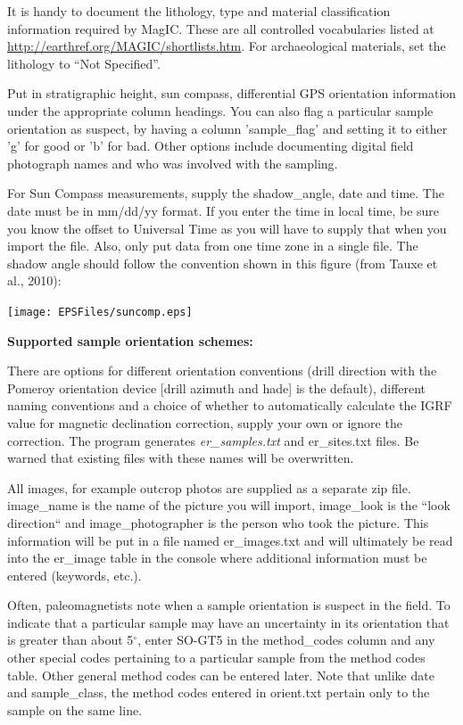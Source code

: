 \documentclass[11pt]{book}
\begin{document}
{   It is handy  to document the lithology, type and material classification information required by MagIC. These  are all controlled vocabularies listed at \url{http://earthref.org/MAGIC/shortlists.htm}.   For archaeological materials, set the lithology to ``Not Specified''.

   Put in stratigraphic height, sun compass, differential GPS orientation information under the appropriate column headings.  You can also flag a particular sample orientation as suspect, by having a column 'sample\_flag' and setting it to either 'g' for good or 'b' for bad.  Other options include documenting digital field photograph names and who was involved with the sampling.

 For Sun Compass measurements, supply the shadow\_angle, date and time. The date must be in mm/dd/yy format. If you enter the time in local time, be sure you know the offset to Universal Time as you will have to supply that when you import the file. Also, only put data from one time zone in a single file. The shadow angle should follow the convention shown in this figure (from Tauxe et al., 2010): \nocite{tauxe10}

  \texttt{[image: EPSFiles/suncomp.eps]}


{\bf Supported sample orientation schemes:}

  There are options for
 different orientation conventions (drill direction with the Pomeroy orientation device  [drill azimuth and hade] is the default), different naming conventions and a choice of whether to automatically calculate the IGRF value for magnetic declination correction, supply your own or ignore the correction.  The program generates {\it er\_samples.txt} and {er\_sites.txt} files.  Be warned that existing files with these names will be overwritten.

 All images, for example outcrop photos are supplied as a separate zip file. image\_name is the name of the picture you will import, image\_look is the ``look direction`` and image\_photographer is the person who took the picture. This information will be put in a file named er\_images.txt and will ultimately be read into the er\_image table in the console where additional information must be entered (keywords, etc.).

Often, paleomagnetists note when a sample orientation is suspect in the field. To indicate that a particular sample may have an uncertainty in its orientation that is greater than about 5$^{\circ}$, enter SO-GT5 in the method\_codes column and any other special codes pertaining to a particular sample from the method codes table. Other general method codes can be entered later. Note that unlike date and sample\_class, the method codes entered in orient.txt pertain only to the sample on the same line.

}
\end{document}
